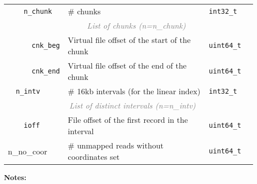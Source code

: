 \documentclass[10pt]{article}
\begin{document}
\begin{center}
\begin{tabular}{|l|l|l|l|l|l|l|}
\cline{3-7}
 & & \multicolumn{2}{l|}{\tt n\_chunk} & \# chunks & {\tt int32\_t} & \\
\cline{3-7}
 & & \multicolumn{5}{c|}{\textcolor{gray}{\it List of chunks (n=n\_chunk)}} \\
\cline{4-7}
 & & \hspace{0.1cm} & {\tt cnk\_beg} & Virtual file offset of the start of the chunk & {\tt uint64\_t} & \\
\cline{4-7}
 & & & {\tt cnk\_end} & Virtual file offset of the end of the chunk & {\tt uint64\_t} & \\
\cline{2-7}
 & \multicolumn{3}{l|}{\tt n\_intv} & \# 16kb intervals (for the linear index) & {\tt int32\_t} & \\
\cline{2-7}
 & \multicolumn{6}{c|}{\textcolor{gray}{\it List of distinct intervals (n=n\_intv)}} \\
\cline{3-7}
 & & \multicolumn{2}{l|}{\tt ioff} & File offset of the first record in the interval & {\tt uint64\_t} & \\\cline{1-7}
\multicolumn{4}{|l|}{\sf n\_no\_coor} & \# unmapped reads without coordinates set & {\tt uint64\_t} & \\
\hline
\end{tabular}
\end{center}

{\bf Notes:}
\end{document}
